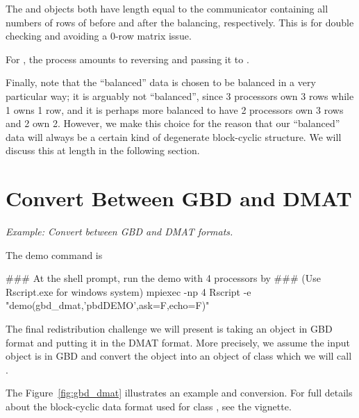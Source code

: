 The  and  objects both have length equal to the communicator containing all numbers of rows of  before and after the balancing, respectively. This is for double checking and avoiding a 0-row matrix issue.

For , the process amounts to reversing  and passing it to .

Finally, note that the ``balanced'' data is chosen to be balanced in a very particular way; it is arguably not ``balanced'', since 3 processors own 3 rows while 1 owns 1 row, and it is perhaps more balanced to have 2 processors own 3 rows and 2 own 2.  However, we make this choice for the reason that our ``balanced'' data will always be a certain kind of degenerate block-cyclic structure.  We will discuss this at length in the following section.




\section{Convert Between GBD and DMAT}
\label{sec:gbd_dmat}

\emph{Example:  Convert between GBD and DMAT formats.}

The demo command is
\begin{Command}
### At the shell prompt, run the demo with 4 processors by
### (Use Rscript.exe for windows system)
mpiexec -np 4 Rscript -e "demo(gbd_dmat,'pbdDEMO',ask=F,echo=F)"
\end{Command}

The final redistribution challenge we will present is taking an object in GBD format and putting it in the DMAT format.  More precisely, we assume the input object  is in GBD and convert the object into an object of
class 
which we will call .


The Figure~\ref{fig:gbd_dmat} illustrates an example  and  conversion.  For full details about the block-cyclic data format used for
class ,
see the  vignette.  

